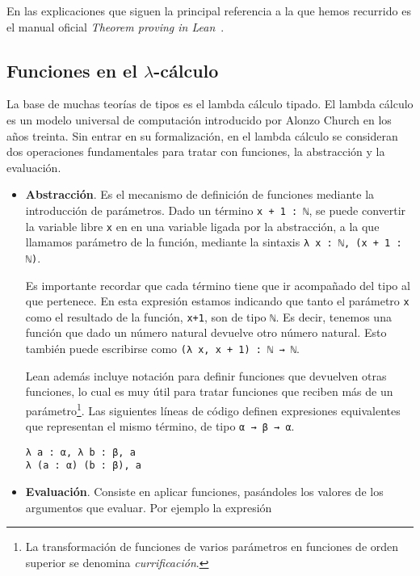 En las explicaciones que siguen la principal referencia a la que hemos recurrido
es el manual oficial \textit{Theorem proving in Lean}~\cite{avigadLeanTheoremProver}.

\subsection{Funciones en el $\lambda$-c\'{a}lculo}

La base de muchas teorías de tipos es el lambda cálculo tipado. El lambda
cálculo es un modelo universal de computación introducido por Alonzo Church en
los años treinta. Sin entrar en su formalización, en el lambda cálculo se
consideran dos operaciones fundamentales para tratar con funciones, la
abstracción y la evaluación.

\begin{itemize}[topsep=0pt]
	\item \textbf{Abstracción}. Es el mecanismo de definición de funciones mediante
	      la introducción de parámetros. Dado un término \lstinline{x + 1 : ℕ},
	      se puede convertir la variable libre \lstinline{x} en en una variable
	      ligada por la abstracción, a la que llamamos parámetro de la función,
	      mediante la sintaxis \lstinline{λ x : ℕ, (x + 1 : ℕ)}.

	      Es importante recordar que cada término tiene que ir acompañado del tipo al
	      que pertenece. En esta expresión estamos indicando que tanto el parámetro
	      \lstinline{x} como el resultado de la función, \lstinline{x+1}, son de tipo
	      \lstinline{ℕ}. Es decir, tenemos una función que dado un número natural
	      devuelve otro número natural. Esto también puede escribirse como
	      \lstinline{(λ x, x + 1) : ℕ → ℕ}.

	      Lean además incluye notación para definir funciones que devuelven
	      otras funciones, lo cual es muy útil para tratar funciones que reciben
	      más de un parámetro\footnote{La transformación de funciones de varios
		      parámetros en funciones de orden superior se denomina
		      \textit{currificación}.}. Las siguientes líneas de código definen
	      expresiones equivalentes que representan el mismo término, de tipo
	      \lstinline{α → β → α}.

	      \begin{lstlisting}
λ a : α, λ b : β, a
λ (a : α) (b : β), a
\end{lstlisting}

	\item \textbf{Evaluación}. Consiste en aplicar funciones, pasándoles los
	      valores de los argumentos que evaluar. Por ejemplo la expresión


\end{itemize}
